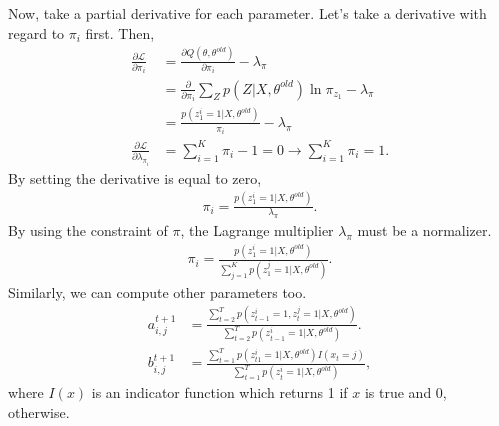 Now, take a partial derivative for each parameter. Let's take a derivative with regard to $\pi_i$ first. Then, 
\begin{align*}
	\frac{\partial \mathcal{L}}{\partial \pi_i} &= \frac{\partial Q(\theta, \theta^{old})}{\partial \pi_i} - \lambda_\pi\\
												&= \frac{\partial }{\partial \pi_i}\sum_Z p(Z|X, \theta^{old}) \ln \pi_{z_{1}} - \lambda_\pi\\
												&= \frac{p(z_1^i=1|X, \theta^{old})}{\pi_i} - \lambda_\pi\\
	\frac{\partial \mathcal{L}}{\partial \lambda_{\pi_i}} &= \sum_{i=1}^K\pi_i - 1 = 0 \to \sum_{i=1}^K\pi_i = 1.
\end{align*}
By setting the derivative is equal to zero, 
\begin{align*}
 \pi_i = \frac{p(z_1^i=1|X, \theta^{old})}{\lambda_\pi}. 
\end{align*}
By using the constraint of $\pi$, the Lagrange multiplier $\lambda_\pi$ must be a normalizer. 
\begin{align*}
	\pi_i = \frac{p(z_1^i=1|X, \theta^{old})}{\sum_{j=1}^K p(z_1^j=1|X, \theta^{old})}. 
\end{align*}
Similarly, we can compute other parameters too. 
\begin{align*}
	a^{t+1}_{i,j} &= \frac{\sum_{t=2}^T p(z_{t-1}^i=1, z_t^j=1|X, \theta^{old})}{\sum_{t=2}^T p(z_{t-1}^i=1|X, \theta^{old})}.\\ 
	b^{t+1}_{i,j} &= \frac{\sum_{t=1}^T p(z_{t1}^i=1|X, \theta^{old})I(x_t=j)}{\sum_{t=1}^T p(z_{t}^i=1|X, \theta^{old})}, 
\end{align*}
where $I(x)$ is an indicator function which returns 1 if $x$ is true and 0, otherwise. 


